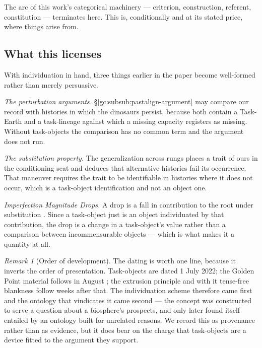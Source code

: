\documentclass[11pt]{article}
\numberwithin{equation}{section}
\theoremstyle{plain}
\theoremstyle{definition}
\theoremstyle{remark}
\newtheorem{remark}[theorem]{Remark}
\begin{document}
The arc of this work's categorical machinery --- criterion,
construction, referent, constitution --- terminates here. This is,
conditionally and at its stated price, where things arise from.

\subsection{What this licenses}\label{to:sub:licenses}

With individuation in hand, three things earlier in the paper become
well-formed rather than merely persuasive.

\emph{The perturbation arguments.} \S\ref{gc:subsub:pastalign-argument}
may compare our record with histories in which the dinosaurs persist,
because both contain a Task-Earth and a task-lineage against which a
missing capacity registers as missing. Without task-objects the
comparison has no common term and the argument does not run.

\emph{The substitution property.} The generalization across rungs
\cite{Nexus} places a trait of ours in the conditioning seat and
deduces that alternative histories fail its occurrence. That maneuver
requires the trait to be identifiable in histories where it does not
occur, which is a task-object identification and not an object one.

\emph{Imperfection Magnitude Drops.} A drop is a fall in contribution to
the root under substitution \cite{Ben26Optimal}. Since a task-object
just is an object individuated by that contribution, the drop is a
change in a task-object's value rather than a comparison between
incommensurable objects --- which is what makes it a quantity at all.

\begin{remark}[Order of development]\label{to:rem:order}
The dating is worth one line, because it inverts the order of
presentation. Task-objects are dated 1 July 2022; the Golden Point
material follows in August \cite{GoldenScience22}; the extrusion
principle and with it tense-free blankness follow weeks after that. The
individuation scheme therefore came first and the ontology that
vindicates it came second --- the concept was constructed to serve a
question about a biosphere's prospects, and only later found itself
entailed by an ontology built for unrelated reasons. We record this as
provenance rather than as evidence, but it does bear on the charge that
task-objects are a device fitted to the argument they support.
\end{remark}
\end{document}
